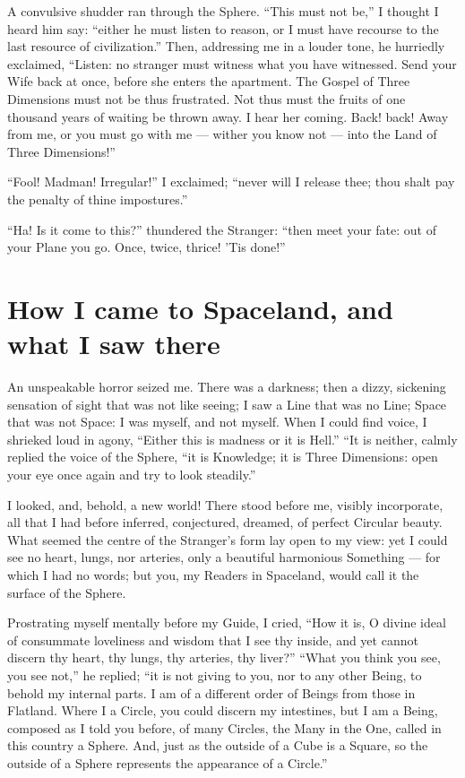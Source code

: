 \documentclass[12pt, a4paper, twoside]{memoir}
\begin{document}
A convulsive shudder ran through the Sphere. ``This must not be,'' I thought I
heard him say: ``either he must listen to reason, or I must have recourse to
the last resource of civilization.'' Then, addressing me in a louder tone, he
hurriedly exclaimed, ``Listen: no stranger must witness what you have
witnessed. Send your Wife back at once, before she enters the apartment. The
Gospel of Three Dimensions must not be thus frustrated. Not thus must the
fruits of one thousand years of waiting be thrown away. I hear her coming.
Back! back! Away from me, or you must go with me --- wither you know not --- into
the Land of Three Dimensions!''

``Fool! Madman! Irregular!'' I exclaimed; ``never will I release thee; thou shalt
pay the penalty of thine impostures.''

``Ha! Is it come to this?'' thundered the Stranger: ``then meet your fate: out of
your Plane you go. Once, twice, thrice! 'Tis done!''



\chapter{How I came to Spaceland, and what I saw there}
An unspeakable horror seized me. There was a darkness; then a dizzy, sickening
sensation of sight that was not like seeing; I saw a Line that was no Line;
Space that was not Space: I was myself, and not myself. When I could find
voice, I shrieked loud in agony, ``Either this is madness or it is Hell.'' ``It
is neither, calmly replied the voice of the Sphere, ``it is Knowledge; it is
Three Dimensions: open your eye once again and try to look steadily.''

I looked, and, behold, a new world! There stood before me, visibly
incorporate, all that I had before inferred, conjectured, dreamed, of perfect
Circular beauty. What seemed the centre of the Stranger's form lay open to my
view: yet I could see no heart, lungs, nor arteries, only a beautiful
harmonious Something --- for which I had no words; but you, my Readers in
Spaceland, would call it the surface of the Sphere.

Prostrating myself mentally before my Guide, I cried, ``How it is, O divine
ideal of consummate loveliness and wisdom that I see thy inside, and yet
cannot discern thy heart, thy lungs, thy arteries, thy liver?'' ``What you think
you see, you see not,'' he replied; ``it is not giving to you, nor to any other
Being, to behold my internal parts. I am of a different order of Beings from
those in Flatland. Where I a Circle, you could discern my intestines, but I am
a Being, composed as I told you before, of many Circles, the Many in the One,
called in this country a Sphere. And, just as the outside of a Cube is a
Square, so the outside of a Sphere represents the appearance of a Circle.''
\end{document}
